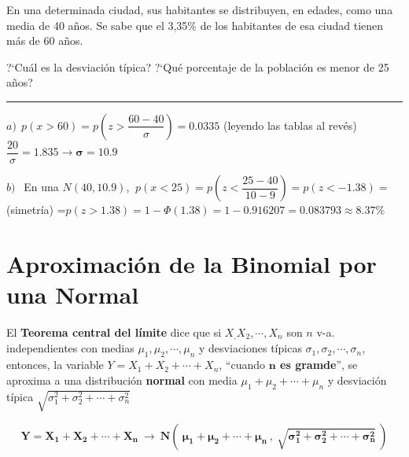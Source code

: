 \vspace{4mm}%
\begin{ejemplo}
\begin{ejre}
	En una determinada ciudad, sus habitantes se distribuyen, en edades, como una media de 40 años. Se sabe que el 3,35\% de los habitantes de esa ciudad tienen más de 60 años.
	
	?`Cuál es la desviación típica? ?`Qué porcentaje de la población es menor de 25 años?
	
\rule{250pt}{0.1pt}

$a)\ \ p(x>60)=p\left( z> \dfrac{60-40}{\sigma} \right) =0.0335 $ \textcolor{gris} (leyendo las tablas al revés) $\dfrac{20}{\sigma}=1.835 \to \boldsymbol {\sigma=10.9}$

$b)\ \ $ En una $N(40,10.9)$, $\ p(x<25)=p \left( z<\dfrac {25-40}{10-9} \right) = p(z<-1.38)= $\textcolor{gris} (simetría) =$p(z>1.38) = 1-\Phi(1.38)=1-0.916207=0.083793 \approx 8.37\%$
\end{ejre}	
\end{ejemplo}


\vspace{5mm} %
\section{Aproximación de la Binomial por una Normal}

\begin{theorem}

	El \textbf{Teorema central del límite} dice que si $X_,X_2,\cdots, X_n$ son $n$ v-a. independientes con medias $\mu_1, \mu_2, \cdots, \mu_n$ y desviaciones típicas $\sigma_1, \sigma_2,\cdots,\sigma_n$, entonces, la variable $Y=X_1+X_2+\cdots +X_n$, ``cuando \textbf{$\boldsymbol{n}$ es gramde}'',  se aproxima a una distribución \textbf{normal} con media $\mu_1+ \mu_2+ \cdots+ \mu_n$ y desviación típica $\sqrt{\sigma_1^2+\sigma_2^2+ \cdots + \sigma_n^2}$

\begin{small} $$ \boldsymbol{ Y=X_1+X_2+\cdots +X_n \ \longrightarrow \ N \left(\ \mu_1+ \mu_2+ \cdots+ \mu_n\ ,\ \sqrt{\sigma_1^2+\sigma_2^2+ \cdots + \sigma_n^2} \ \right) }$$ \end{small}

\end{theorem}

\vspace{4mm} %

